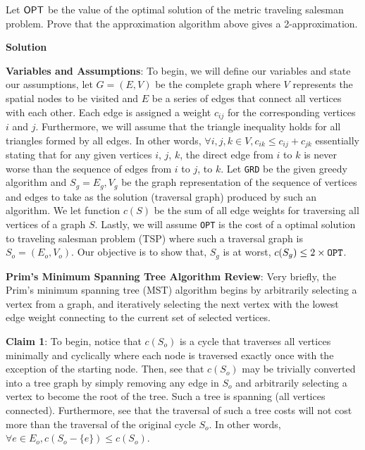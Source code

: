 \documentclass[11pt]{article}
\newcommand{\solution}{\vspace{.25in}\textbf{Solution}\vspace{.10in}}
\begin{document}
Let ${\sf OPT}$ be the value of the optimal solution of the metric traveling salesman problem. Prove that the approximation algorithm above gives a 2-approximation.

\solution

\textbf{Variables and Assumptions}: To begin, we will define our variables and state our assumptions, let \(G = (E, V)\) be the complete graph where \(V\) represents the spatial nodes to be visited and \(E\) be a series of edges that connect all vertices with each other. Each edge is assigned a weight \(c_{ij}\) for the corresponding vertices \(i\) and \(j\). Furthermore, we will assume that the triangle inequality holds for all triangles formed by all edges. In other words, \(\forall i, j, k \in V, c_{ik} \leq c_{ij} + c_{jk}\) essentially stating that for any given vertices \(i\), \(j\), \(k\), the direct edge from \(i\) to \(k\) is never worse than the sequence of edges from \(i\) to \(j\), to \(k\). Let \verb|GRD| be the given greedy algorithm and \(S_g = E_g, V_g\) be the graph representation of the sequence of vertices and edges to take as the solution (traversal graph) produced by such an algorithm. We let function \(c(S)\) be the sum of all edge weights for traversing all vertices of a graph \(S\). Lastly, we will assume \verb|OPT| is the cost of a optimal solution to traveling salesman problem (TSP) where such a traversal graph is \(S_o = (E_o, V_o)\). Our objective is to show that, \(S_g\) is at worst, \(c(S_g) \leq 2 \times \verb|OPT|\).

\medskip

\textbf{Prim's Minimum Spanning Tree Algorithm Review}: Very briefly, the Prim's minimum spanning tree (MST) algorithm begins by arbitrarily selecting a vertex from a graph, and iteratively selecting the next vertex with the lowest edge weight connecting to the current set of selected vertices.

\medskip

\textbf{Claim 1}: To begin, notice that \(c(S_o)\) is a cycle that traverses all vertices minimally and cyclically where each node is traversed exactly once with the exception of the starting node. Then, see that \(c(S_o)\) may be trivially converted into a tree graph by simply removing any edge in \(S_o\) and arbitrarily selecting a vertex to become the root of the tree. Such a tree is spanning (all vertices connected). Furthermore, see that the traversal of such a tree costs will not cost more than the traversal of the original cycle \(S_o\). In other words, \(\forall e \in E_o, c(S_o - \{e\}) \leq c(S_o)\).
\end{document}
